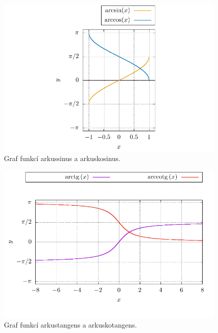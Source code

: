 \begin{figure}[H]
    \centering
    \includegraphics{Gnuplot/cv1/Figures/arcsin-arccos.pdf}
    \caption{Graf funkcí arkussinus a arkuskosinus.}
    \label{obr:arcsin-arccos}
\end{figure}
\begin{figure}[H]
    \centering
    \includegraphics{Gnuplot/cv1/Figures/arctg-arccotg.pdf}
    \caption{Graf funkcí arkustangens a arkuskotangens.}
    \label{obr:arctan-arccot}
\end{figure}
